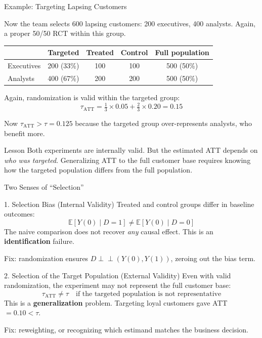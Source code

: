 \documentclass[aspectratio=169, 11pt, handout]{beamer}
\newcommand{\E}{\mathbb{E}}
\newcommand{\indep}{\perp\!\!\!\perp}
\begin{document}
\begin{frame}{Example: Targeting Lapsing Customers}

Now the team selects 600 lapsing customers: 200 executives, 400 analysts. Again, a proper 50/50 RCT within this group.

\begin{center}
\small
\begin{tabular}{lcccc}
\toprule
& \textbf{Targeted} & \textbf{Treated} & \textbf{Control} & \textbf{Full population} \\
\midrule
Executives & 200 (33\%) & 100 & 100 & 500 (50\%) \\
Analysts & 400 (67\%) & 200 & 200 & 500 (50\%) \\
\bottomrule
\end{tabular}
\end{center}

\pause

Again, randomization is valid within the targeted group:
\[
\tau_{\text{ATT}} = \tfrac{1}{3} \times 0.05 + \tfrac{2}{3} \times 0.20 = 0.15
\]

Now $\tau_{\text{ATT}} > \tau = 0.125$ because the targeted group over-represents analysts, who benefit more.


\begin{alertblock}{Lesson}
Both experiments are internally valid. But the estimated ATT depends on \emph{who was targeted}. Generalizing ATT to the full customer base requires knowing how the targeted population differs from the full population.
\end{alertblock}
\end{frame}

\begin{frame}{Two Senses of ``Selection''}

\begin{block}{1. Selection Bias (Internal Validity)}
Treated and control groups differ in baseline outcomes:
\[
\E[Y(0) \mid D = 1] \neq \E[Y(0) \mid D = 0]
\]
The naive comparison does not recover \emph{any} causal effect. This is an \textbf{identification} failure.

Fix: randomization ensures $D \indep (Y(0), Y(1))$, zeroing out the bias term.
\end{block}

\pause

\begin{block}{2. Selection of the Target Population (External Validity)}
Even with valid randomization, the experiment may not represent the full customer base:
\[
\tau_{\text{ATT}} \neq \tau \quad \text{if the targeted population is not representative}
\]
This is a \textbf{generalization} problem. Targeting loyal customers gave ATT $= 0.10 < \tau$.

Fix: reweighting, or recognizing which estimand matches the business decision.
\end{block}
\end{frame}
\end{document}
